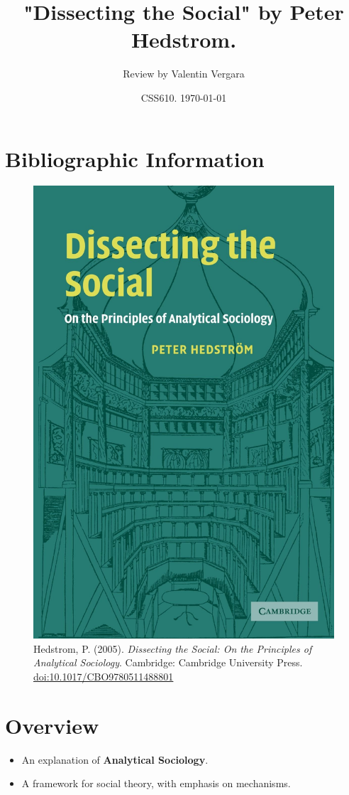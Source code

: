 \documentclass[11pt]{article}
\author{Review by Valentin Vergara}
\date{CSS610. \today}
\title{"Dissecting the Social" by Peter Hedstrom.}
\begin{document}
\maketitle


\section*{Bibliographic Information}
\label{sec:orgcd46151}


\begin{figure}[htbp]
\centering
\includegraphics[width=.9\linewidth]{cover.jpg}
\caption{Hedstrom, P. (2005). \emph{Dissecting the Social: On the Principles of Analytical Sociology}. Cambridge: Cambridge University Press. \href{https://doi.org/10.1017/CBO9780511488801}{doi:10.1017/CBO9780511488801}}
\end{figure}

\section*{Overview}
\label{sec:org7f736ec}
\begin{itemize}
\item An explanation of \textbf{Analytical Sociology}.
\item A framework for social theory, with emphasis on mechanisms.
\end{itemize}
\end{document}
